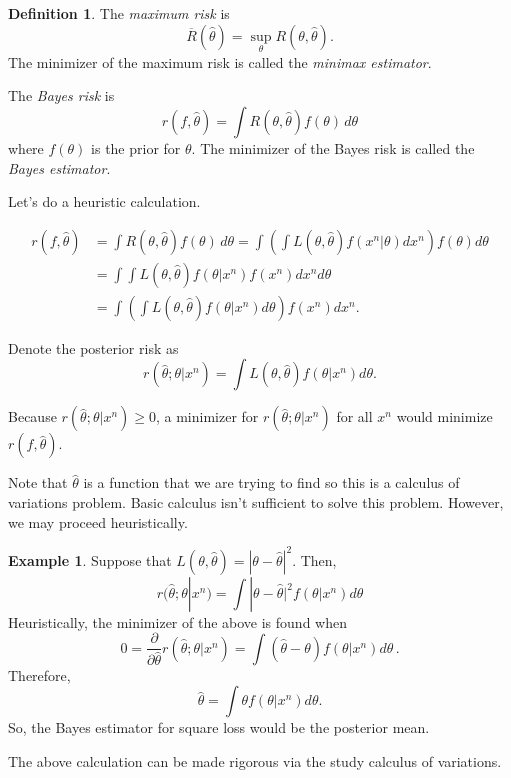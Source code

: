 \documentclass[
  openany]{book}
\theoremstyle{definition}
\newtheorem{definition}{Definition}[chapter]
\theoremstyle{definition}
\newtheorem{example}{Example}[chapter]
\theoremstyle{definition}
\theoremstyle{definition}
\theoremstyle{remark}
\begin{document}
\begin{definition}
The \emph{maximum risk} is
\[ \overline{R}(\hat \theta) = \sup_\theta R(\theta, \hat \theta).\]
The minimizer of the maximum risk is called the \emph{minimax estimator}.

The \emph{Bayes risk} is
\[ r(f, \hat \theta) = \int R(\theta, \hat\theta) f(\theta) \, d\theta\]
where \(f(\theta)\) is the prior for \(\theta\).
The minimizer of the Bayes risk is called the \emph{Bayes estimator}.
\end{definition}

Let's do a heuristic calculation.

\begin{align*}
r(f,\hat \theta) &= \int R(\theta, \hat \theta) f(\theta) \, d\theta 
        = \int \left( \int L(\theta, \hat \theta) f(x^n| \theta) dx^n \right) f(\theta) d \theta \\
        &= \int  \int L(\theta, \hat \theta)   f(\theta|x^n) f(x^n) d x^n d \theta \\
        &= \int  \left( \int L(\theta, \hat \theta)   f(\theta|x^n) d \theta \right) f(x^n) d x^n .
\end{align*}

Denote the posterior risk as
\[r(\hat \theta; \theta |x^n) = \int L(\theta, \hat \theta)   f(\theta|x^n) d \theta.  \]

Because \(r(\hat \theta; \theta | x^n) \geq 0\), a minimizer for
\(r(\hat \theta; \theta | x^n)\) for all \(x^n\)
would minimize \(r(f, \hat \theta)\).

Note that \(\hat \theta\) is a function that we are trying to find so
this is a calculus of variations problem. Basic calculus isn't sufficient
to solve this problem. However, we may proceed heuristically.

\begin{example}
Suppose that \(L(\theta, \hat \theta) = |\theta - \hat \theta|^2\).
Then,
\[r(\hat \theta; \theta | x^n) = \int |\theta - \hat \theta|^2 f(\theta| x^n)  d\theta\]
Heuristically, the minimizer of the above is found when
\[ 0 =   \frac{\partial}{\partial \hat\theta} r(\hat \theta; \theta | x^n) 
=  \int (\hat \theta - \theta  ) f(\theta| x^n)  d\theta \,.\]
Therefore,
\[ \hat \theta = \int \theta f(\theta | x^n) d \theta.\]
So, the Bayes estimator for square loss would be the posterior mean.
\end{example}

The above calculation can be made rigorous via the study calculus of variations.
\end{document}

